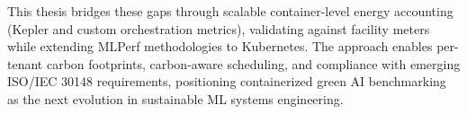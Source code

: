 This thesis bridges these gaps through scalable container-level energy accounting (Kepler and custom orchestration metrics), validating against facility meters while extending MLPerf methodologies to Kubernetes. The approach enables per-tenant carbon footprints, carbon-aware scheduling, and compliance with emerging ISO/IEC 30148 requirements, positioning containerized green AI benchmarking as the next evolution in sustainable ML systems engineering.\@
